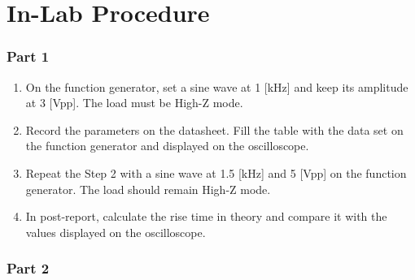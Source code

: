 \documentclass{article}
\begin{document}
\section{In-Lab Procedure}
\subsubsection{Part 1}
\begin{enumerate}
\item
On the function generator, set a sine wave at 1 [kHz] and keep its amplitude at 3 [Vpp]. The load must be High-Z mode.

\item

Record the parameters on the datasheet. Fill the table with the data set on the function generator and displayed on the oscilloscope.

\item

Repeat the Step 2 with a sine wave at 1.5 [kHz] and 5 [Vpp] on the function generator. The load should remain High-Z mode.

\item

In post-report, calculate the rise time in theory and compare it with the values displayed on the oscilloscope.

\end{enumerate}

\subsubsection{Part 2}
\end{document}
